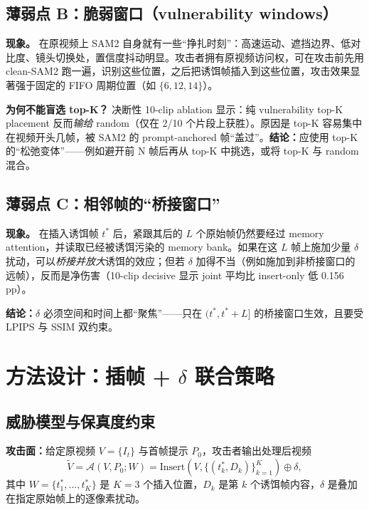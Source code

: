 \documentclass[11pt,a4paper]{ctexart}
\begin{document}
\subsection{薄弱点 B：脆弱窗口（vulnerability windows）}

\textbf{现象。} 在原视频上 SAM2 自身就有一些``挣扎时刻''：高速运动、遮挡边界、低对比度、镜头切换处，置信度抖动明显。攻击者拥有原视频访问权，可在攻击前先用 clean-SAM2 跑一遍，识别这些位置，之后把诱饵帧插入到这些位置，攻击效果显著强于固定的 FIFO 周期位置（如 $\{6,12,14\}$）。

\textbf{为何不能盲选 top-K？} 决断性 10-clip ablation 显示：纯 vulnerability top-K placement 反而\emph{输给} random（仅在 2/10 个片段上获胜）。原因是 top-K 容易集中在视频开头几帧，被 SAM2 的 prompt-anchored 帧``盖过''。\textbf{结论：}应使用 top-K 的``松弛变体''——例如避开前 N 帧后再从 top-K 中挑选，或将 top-K 与 random 混合。

\subsection{薄弱点 C：相邻帧的``桥接窗口''}

\textbf{现象。} 在插入诱饵帧 $t^*$ 后，紧跟其后的 $L$ 个原始帧仍然要经过 memory attention，并读取已经被诱饵污染的 memory bank。如果在这 $L$ 帧上施加少量 $\delta$ 扰动，可以\emph{桥接并放大}诱饵的效应；但若 $\delta$ 加得不当（例如施加到非桥接窗口的远帧），反而是净伤害（10-clip decisive 显示 joint 平均比 insert-only 低 0.156 pp）。

\textbf{结论：}$\delta$ 必须空间和时间上都``聚焦''——只在 $(t^*, t^*{+}L]$ 的桥接窗口生效，且要受 LPIPS 与 SSIM 双约束。

\section{方法设计：插帧 + $\delta$ 联合策略}
\label{sec:method}

\subsection{威胁模型与保真度约束}

\textbf{攻击面：}给定原视频 $V = \{I_t\}$ 与首帧提示 $P_0$，攻击者输出处理后视频
\[
\tilde{V} = \mathcal{A}(V, P_0; W) = \mathrm{Insert}(V, \{(t^*_k, D_k)\}_{k=1}^{K}) \oplus \delta,
\]
其中 $W = \{t^*_1, \dots, t^*_K\}$ 是 $K=3$ 个插入位置，$D_k$ 是第 $k$ 个诱饵帧内容，$\delta$ 是叠加在指定原始帧上的逐像素扰动。
\end{document}
